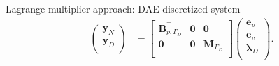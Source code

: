 \documentclass[aspectratio=169]{ISAE-Beamer}
\begin{document}
\begin{frame}{Lagrange multiplier approach: DAE discretized system}
\begin{equation*}
\begin{aligned}
\begin{pmatrix}
\mathbf{y}_N \\
\mathbf{y}_D \\
\end{pmatrix} &=
\begin{bmatrix}
\mathbf{B}_{p, \Gamma_D}^\top & \mathbf{0} & \mathbf{0}\\ 
\mathbf{0} & \mathbf{0} & \mathbf{M}_{\Gamma_D} \\ 
\end{bmatrix}
\begin{pmatrix}
{\mathbf{e}}_p\\
{\mathbf{e}}_v\\
{\bm{\lambda}}_D \\
\end{pmatrix}.
\end{aligned}
\end{equation*}

\end{frame}
\end{document}
